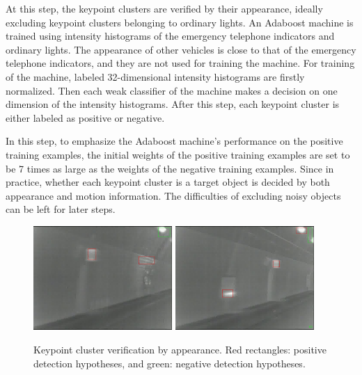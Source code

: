 At this step, the keypoint clusters are verified by their appearance, ideally excluding keypoint clusters belonging to ordinary lights. An Adaboost machine is trained using intensity histograms of the emergency telephone indicators and ordinary lights. The appearance of other vehicles is close to that of the emergency telephone indicators, and they are not used for training the machine. For training of the machine, labeled 32-dimensional intensity histograms are firstly normalized. Then each weak classifier of the machine makes a decision on one dimension of the intensity histograms. After this step, each keypoint cluster is either labeled as positive or negative.

In this step, to emphasize the Adaboost machine's performance on the positive training examples,  the initial weights of the positive training examples are set to be 7 times as large as the weights of the negative training examples.  Since in practice, whether each keypoint cluster is a target object is decided by both appearance and motion information. The difficulties of excluding noisy objects can be left for later steps.
\begin{figure}[b]
\includegraphics[width=0.47\textwidth,bb=0 0 640 480]{17Rgsimg00039.jpg}
\includegraphics[width=0.47\textwidth,bb=0 0 640 480]{8Rgsimg00028.jpg}
\caption[Keypoint cluster verification by appearance]{Keypoint cluster verification by appearance. Red rectangles: positive detection hypotheses, and green: negative detection hypotheses.}
\label{fig:fiff}
\end{figure}

